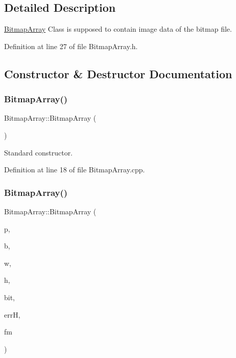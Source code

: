 \subsection{Detailed Description}
\mbox{\hyperlink{classBitmapArray}{Bitmap\+Array}} Class is supposed to contain image data of the bitmap file. 

Definition at line 27 of file Bitmap\+Array.\+h.



\subsection{Constructor \& Destructor Documentation}
\mbox{\label{classBitmapArray_a582e5e54ec078d30fde87ae7b4540f32}} 
\subsubsection{\texorpdfstring{BitmapArray()}{BitmapArray()}\hspace{0.1cm}{\footnotesize\ttfamily [1/4]}}
{\footnotesize\ttfamily Bitmap\+Array\+::\+Bitmap\+Array (\begin{DoxyParamCaption}{ }\end{DoxyParamCaption})}



Standard constructor. 



Definition at line 18 of file Bitmap\+Array.\+cpp.

\mbox{\label{classBitmapArray_ae11059a1f2f1af199d0a2cf6f316397d}} 
\subsubsection{\texorpdfstring{BitmapArray()}{BitmapArray()}\hspace{0.1cm}{\footnotesize\ttfamily [2/4]}}
{\footnotesize\ttfamily Bitmap\+Array\+::\+Bitmap\+Array (\begin{DoxyParamCaption}\item[{std\+::string}]{p,  }\item[{uint32\+\_\+t}]{b,  }\item[{uint32\+\_\+t}]{w,  }\item[{uint32\+\_\+t}]{h,  }\item[{uint32\+\_\+t}]{bit,  }\item[{\mbox{\hyperlink{classErrorHandler}{Error\+Handler}} $\ast$}]{errH,  }\item[{std\+::string}]{fm }\end{DoxyParamCaption})}




